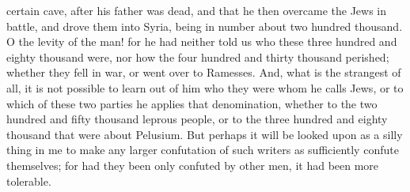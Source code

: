 certain cave, after his father was dead, and that he then overcame the
Jews in battle, and drove them into Syria, being in number about two
hundred thousand. O the levity of the man! for he had neither told us who
these three hundred and eighty thousand were, nor how the four hundred and
thirty thousand perished; whether they fell in war, or went over to
Ramesses. And, what is the strangest of all, it is not possible to learn
out of him who they were whom he calls Jews, or to which of these two
parties he applies that denomination, whether to the two hundred and fifty
thousand leprous people, or to the three hundred and eighty thousand that
were about Pelusium. But perhaps it will be looked upon as a silly thing
in me to make any larger confutation of such writers as sufficiently
confute themselves; for had they been only confuted by other men, it had
been more tolerable.

